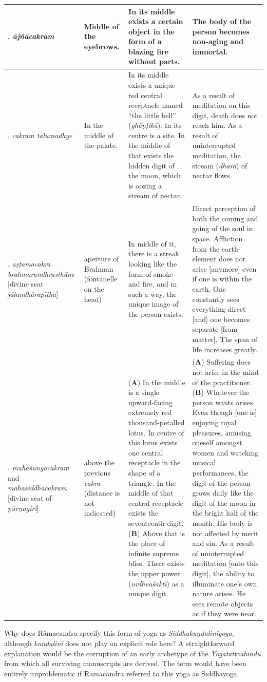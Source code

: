 \begin{longtable}{|>{\raggedright\arraybackslash}p{2cm}|>{\raggedright\arraybackslash}p{1.75cm}|>{\raggedright\arraybackslash}p{3.25cm}|>{\raggedright\arraybackslash}p{3.5cm}|}
\hline
6. \textit{ājñācakram} & Middle of the eyebrows. & In its middle exists a certain object in the form of a blazing fire without parts. & The body of the person becomes non-aging and immortal. \\
\hline
7. \textit{cakram tālumadhye} & In the middle of the palate. & In its middle exists a unique red central receptacle named ``the little bell'' (\textit{ghāṇṭikā}). In its centre is a site. In the middle of that exists the hidden digit of the moon, which is oozing a stream of nectar. & As a result of meditation on this digit, death does not reach him. As a result of uninterrupted meditation, the stream (\textit{dhārā}) of nectar flows. \\
\hline
8. \textit{aṣṭamacakra brahmarandhrasthāne} [divine seat \textit{jālandhārapītha}] & aperture of Brahman (fontanelle on the head) & In middle of it, there is a streak looking like the form of smoke and fire, and in such a way, the unique image of the person exists. & Direct perception of both the coming and going of the soul in space. Affliction from the earth-element does not arise [anymore] even if one is within the earth. One constantly sees everything direct [and] one becomes separate [from matter]. The span of life increases greatly. \\
\hline
9. \textit{mahāśūnyacakram} and \textit{mahāsiddhacakram} [divine seat of \textit{pūrṇagiri}] & above the previous \textit{cakra} (distance is not indicated) & (\textbf{A}) In the middle is a single upward-facing extremely red thousand-petalled lotus. In centre of this lotus exists one central receptacle in the shape of a triangle. In the middle of that central receptacle exists the seventeenth digit. (\textbf{B}) Above that is the place of infinite supreme bliss. There exists the upper power (\textit{ūrdhvaśakti}) as a unique digit. & (\textbf{A}) Suffering does not arise in the mind of the practitioner. (\textbf{B}) Whatever the person wants arises. Even though [one is] enjoying royal pleasures, amusing oneself amongst women and watching musical performances, the digit of the person grows daily like the digit of the moon in the bright half of the month. His body is not affected by merit and sin. As a result of uninterrupted meditation [onto this digit], the ability to illuminate one's own nature arises. He sees remote objects as if they were near. \\
\end{longtable}
\normalsize

Why does Rāmacandra specify this form of yoga as \emph{Siddhakuṇḍalinīyoga}, although \textit{kuṇḍalinī} does not play an explicit role here? A straightforward explanation would be the corruption of an early archetype of the \textit{Yogatattvabindu} from which all surviving manuscripts are derived. The term would have been entirely unproblematic if Rāmacandra referred to this yoga as Siddhayoga.

